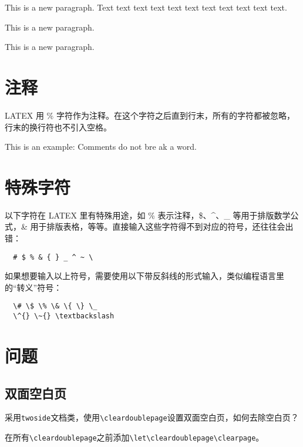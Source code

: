 \begin{codeshow}
  This is a new paragraph. Text text text
  text text   text text text text text text.

  This is a new paragraph.\par
  This is a new paragraph.
\end{codeshow}

\section{注释}\label{sec:comment}
LATEX 用 \% 字符作为注释。在这个字符之后直到行末，所有的字符都被忽略，行末的换行符也不引入空格。

\begin{codeshow}
  This is an %
  example: Comments do not bre%
  ak a word.
\end{codeshow}

\section{特殊字符}\label{sec:special}

以下字符在 LATEX 里有特殊用途，如 \% 表示注释，\$、\^{}、\_ 等用于排版数学公式，\& 用于排版表格，等等。直接输入这些字符得不到对应的符号，还往往会出错：

\begin{lstlisting}
  # $ % & { } _ ^ ~ \
\end{lstlisting}

如果想要输入以上符号，需要使用以下带反斜线的形式输入，类似编程语言里的“转义”符号：
\begin{lstlisting}
  \# \$ \% \& \{ \} \_
  \^{} \~{} \textbackslash
\end{lstlisting}

\section{问题}\label{sec:qa}
\subsection{双面空白页}\label{subsec:blankpage}
采用\lstinline{twoside}文档类，使用\lstinline{\cleardoublepage}设置双面空白页，如何去除空白页？

在所有\lstinline{\cleardoublepage}之前添加\lstinline{\let\cleardoublepage\clearpage}。